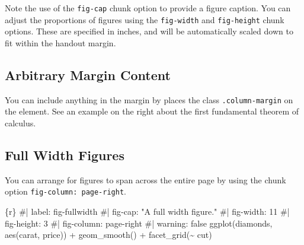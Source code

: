 \documentclass[
  letterpaper,
  DIV=11,
  numbers=noendperiod,
  oneside]{scrartcl}
\newenvironment{Shaded}{\begin{snugshade}}{\end{snugshade}}
\newcommand{\CommentTok}[1]{\textcolor[rgb]{0.37,0.37,0.37}{#1}}
\newcommand{\FunctionTok}[1]{\textcolor[rgb]{0.28,0.35,0.67}{#1}}
\newcommand{\InformationTok}[1]{\textcolor[rgb]{0.37,0.37,0.37}{#1}}
\newcommand{\NormalTok}[1]{\textcolor[rgb]{0.00,0.23,0.31}{#1}}
\newcommand{\SpecialCharTok}[1]{\textcolor[rgb]{0.37,0.37,0.37}{#1}}
\begin{document}
Note the use of the \texttt{fig-cap} chunk option to provide a figure
caption. You can adjust the proportions of figures using the
\texttt{fig-width} and \texttt{fig-height} chunk options. These are
specified in inches, and will be automatically scaled down to fit within
the handout margin.

\hypertarget{arbitrary-margin-content}{%
\subsection{Arbitrary Margin Content}\label{arbitrary-margin-content}}

You can include anything in the margin by places the class
\texttt{.column-margin} on the element. See an example on the right
about the first fundamental theorem of calculus.


\hypertarget{full-width-figures}{%
\subsection{Full Width Figures}\label{full-width-figures}}

You can arrange for figures to span across the entire page by using the
chunk option \texttt{fig-column:\ page-right}.

\begin{Shaded}
\begin{Highlighting}[]
\InformationTok{\textasciigrave{}\textasciigrave{}\textasciigrave{}\{r\}}
\CommentTok{\#| label: fig{-}fullwidth}
\CommentTok{\#| fig{-}cap: "A full width figure."}
\CommentTok{\#| fig{-}width: 11}
\CommentTok{\#| fig{-}height: 3}
\CommentTok{\#| fig{-}column: page{-}right}
\CommentTok{\#| warning: false}
\FunctionTok{ggplot}\NormalTok{(diamonds, }\FunctionTok{aes}\NormalTok{(carat, price)) }\SpecialCharTok{+} \FunctionTok{geom\_smooth}\NormalTok{() }\SpecialCharTok{+}
  \FunctionTok{facet\_grid}\NormalTok{(}\SpecialCharTok{\textasciitilde{}}\NormalTok{ cut)}
\InformationTok{\textasciigrave{}\textasciigrave{}\textasciigrave{}}
\end{Highlighting}
\end{Shaded}
\end{document}
